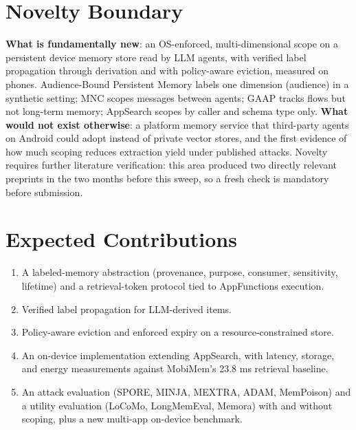\documentclass[11pt]{article}
\begin{document}
\section{Novelty Boundary}
\textbf{What is fundamentally new}: an OS-enforced, multi-dimensional scope on a persistent device memory store read by LLM agents, with verified label propagation through derivation and with policy-aware eviction, measured on phones. Audience-Bound Persistent Memory labels one dimension (audience) in a synthetic setting; MNC scopes messages between agents; GAAP tracks flows but not long-term memory; AppSearch scopes by caller and schema type only. \textbf{What would not exist otherwise}: a platform memory service that third-party agents on Android could adopt instead of private vector stores, and the first evidence of how much scoping reduces extraction yield under published attacks. Novelty requires further literature verification: this area produced two directly relevant preprints in the two months before this sweep, so a fresh check is mandatory before submission.

\section{Expected Contributions}
\begin{enumerate}
  \item A labeled-memory abstraction (provenance, purpose, consumer, sensitivity, lifetime) and a retrieval-token protocol tied to AppFunctions execution.
  \item Verified label propagation for LLM-derived items.
  \item Policy-aware eviction and enforced expiry on a resource-constrained store.
  \item An on-device implementation extending AppSearch, with latency, storage, and energy measurements against MobiMem's 23.8 ms retrieval baseline.
  \item An attack evaluation (SPORE, MINJA, MEXTRA, ADAM, MemPoison) and a utility evaluation (LoCoMo, LongMemEval, Memora) with and without scoping, plus a new multi-app on-device benchmark.
\end{enumerate}
\end{document}
